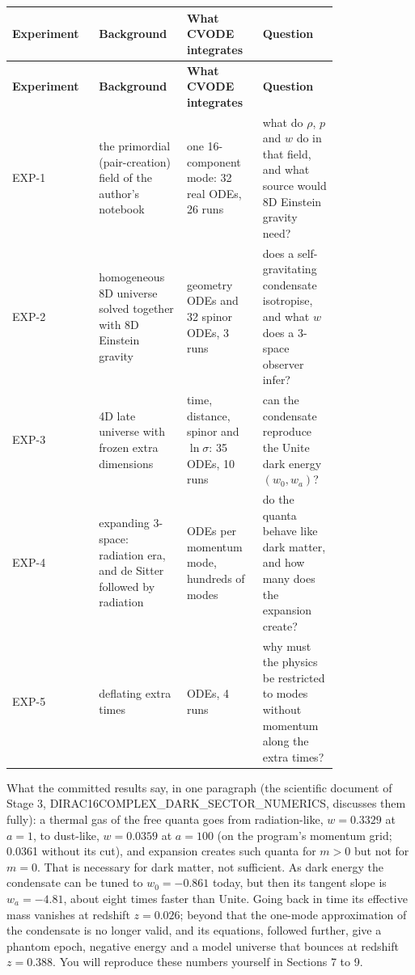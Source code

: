 \documentclass[11pt]{article}
\begin{document}
\begingroup
\small
\begin{longtable}{@{}>{\raggedright\arraybackslash}p{0.200\linewidth}>{\raggedright\arraybackslash}p{0.200\linewidth}>{\raggedright\arraybackslash}p{0.200\linewidth}>{\raggedright\arraybackslash}p{0.200\linewidth}@{}}
\toprule
\textbf{Experiment} & \textbf{Background} & \textbf{What CVODE integrates} & \textbf{Question} \\
\midrule
\endfirsthead
\toprule
\textbf{Experiment} & \textbf{Background} & \textbf{What CVODE integrates} & \textbf{Question} \\
\midrule
\endhead
EXP-1 & the primordial (pair-creation) field of the author's notebook & one 16-component mode: 32 real ODEs, 26 runs & what do $\rho$, $p$ and $w$ do in that field, and what source would 8D Einstein gravity need? \\
EXP-2 & homogeneous 8D universe solved together with 8D Einstein gravity & 6 geometry ODEs and 32 spinor ODEs, 3 runs & does a self-gravitating condensate isotropise, and what $w$ does a 3-space observer infer? \\
EXP-3 & 4D late universe with frozen extra dimensions & time, distance, spinor and $\ln\sigma$: 35 ODEs, 10 runs & can the condensate reproduce the Unite dark energy $(w_0,w_a)$? \\
EXP-4 & expanding 3-space: radiation era, and de Sitter followed by radiation & 32 ODEs per momentum mode, hundreds of modes & do the quanta behave like dark matter, and how many does the expansion create? \\
EXP-5 & deflating extra times & 32 ODEs, 4 runs & why must the physics be restricted to modes without momentum along the extra times? \\
\bottomrule
\end{longtable}
\endgroup

What the committed results say, in one paragraph (the scientific document of Stage 3, DIRAC16COMPLEX\_DARK\_SECTOR\_NUMERICS, discusses them fully): a thermal gas of the free quanta goes from radiation-like, $w=0.3329$ at $a=1$, to dust-like, $w=0.0359$ at $a=100$ (on the program's momentum grid; 0.0361 without its cut), and expansion creates such quanta for $m>0$ but not for $m=0$. That is necessary for dark matter, not sufficient. As dark energy the condensate can be tuned to $w_0=-0.861$ today, but then its tangent slope is $w_a=-4.81$, about eight times faster than Unite. Going back in time its effective mass vanishes at redshift $z=0.026$; beyond that the one-mode approximation of the condensate is no longer valid, and its equations, followed further, give a phantom epoch, negative energy and a model universe that bounces at redshift $z=0.388$. You will reproduce these numbers yourself in Sections 7 to 9.
\end{document}
